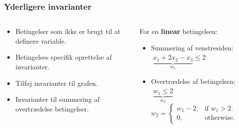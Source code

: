 \documentclass[smaller]{beamer}
\begin{document}

 \begin{frame}
 \frametitle{Yderligere invarianter}
 \begin{columns}[T]
\begin{column}[T]{0.5\linewidth} 
 \begin{itemize}[<+->]
  \item Betingelser som ikke er brugt til at definere variable. 
  \item Betingelses specifik oprettelse af invarianter.
  \item Tilføj invarianter til grafen. 
  \item Invarianter til summering af overtrædelse betingelser.
\end{itemize}

\end{column}
\pause
\begin{column}[T]{0.55\linewidth} 
 For en \textbf{linear} betingelsen: 
  \begin{itemize}[<+->]
  \item Summering af venstresiden: $\;\underbrace{x_1 + 2x_2 -x_3}_{w_1} \leq 2$
  \item Overtrædelse af betingelsen: $\; \underbrace{w_1 \leq 2}_{w_2}  $\medskip  \\ 
     $w_2 = \begin{cases}
        w_1-2, & \text{if $w_1> 2$}.\\
        0, & \text{otherwise}.
       \end{cases}$
 \end{itemize}

\end{column}
  \end{columns}
 \end{frame}


\end{document}
